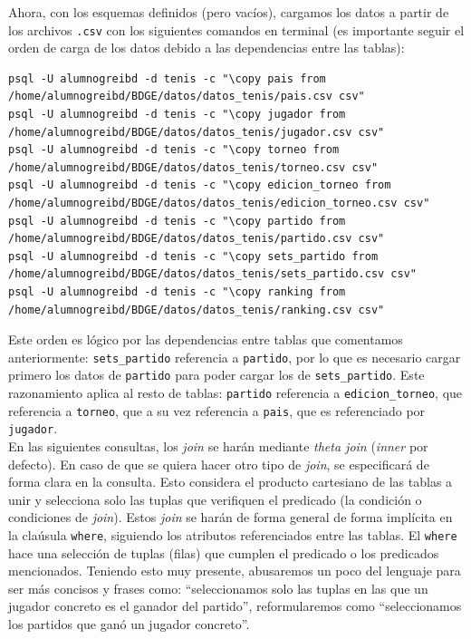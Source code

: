 Ahora, con los esquemas definidos (pero vacíos), cargamos los datos a partir de los archivos \texttt{.csv} con los siguientes comandos en terminal (es importante seguir el orden de carga de los datos debido a las dependencias entre las tablas):

\begin{lstlisting}[style=terminal]
psql -U alumnogreibd -d tenis -c "\copy pais from /home/alumnogreibd/BDGE/datos/datos_tenis/pais.csv csv"
psql -U alumnogreibd -d tenis -c "\copy jugador from /home/alumnogreibd/BDGE/datos/datos_tenis/jugador.csv csv"
psql -U alumnogreibd -d tenis -c "\copy torneo from /home/alumnogreibd/BDGE/datos/datos_tenis/torneo.csv csv"
psql -U alumnogreibd -d tenis -c "\copy edicion_torneo from /home/alumnogreibd/BDGE/datos/datos_tenis/edicion_torneo.csv csv"
psql -U alumnogreibd -d tenis -c "\copy partido from /home/alumnogreibd/BDGE/datos/datos_tenis/partido.csv csv"
psql -U alumnogreibd -d tenis -c "\copy sets_partido from /home/alumnogreibd/BDGE/datos/datos_tenis/sets_partido.csv csv"
psql -U alumnogreibd -d tenis -c "\copy ranking from /home/alumnogreibd/BDGE/datos/datos_tenis/ranking.csv csv"
\end{lstlisting}

Este orden es lógico por las dependencias entre tablas que comentamos anteriormente: \texttt{sets\_partido} referencia a \texttt{partido}, por lo que es necesario cargar primero los datos de \texttt{partido} para poder cargar los de \texttt{sets\_partido}. Este razonamiento aplica al resto de tablas: \texttt{partido} referencia a \texttt{edicion\_torneo}, que referencia a \texttt{torneo}, que a su vez referencia a \texttt{pais}, que es referenciado por \texttt{jugador}. \\

En las siguientes consultas, los \textit{join} se harán mediante \textit{theta join} (\textit{inner} por defecto). En caso de que se quiera hacer otro tipo de \textit{join}, se especificará de forma clara en la consulta. Esto considera el producto cartesiano de las tablas a unir y selecciona solo las tuplas que verifiquen el predicado (la condición o condiciones de \textit{join}). Estos \textit{join} se harán de forma general de forma implícita en la claúsula \texttt{where}, siguiendo los atributos referenciados entre las tablas. El \texttt{where} hace una selección de tuplas (filas) que cumplen el predicado o los predicados mencionados. Teniendo esto muy presente, abusaremos un poco del lenguaje para ser más concisos y frases como: ``seleccionamos solo las tuplas en las que un jugador concreto es el ganador del partido'', reformularemos como ``seleccionamos los partidos que ganó un jugador concreto''. \\


